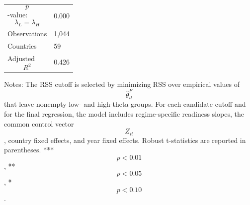 \begin{table}[H]
\begin{threeparttable}
\begin{tabularx}{\textwidth}{lY}
$$p$$-value: $$\lambda_L=\lambda_H$$ & 0.000 \\
Observations & 1,044 \\
Countries & 59 \\
Adjusted $$R^2$$ & 0.426 \\
\bottomrule
\end{tabularx}
\begin{tablenotes}[flushleft]\footnotesize
\item Notes: The RSS cutoff is selected by minimizing RSS over empirical values of $$\widehat{\theta}^{F}_{it}$$ that leave nonempty low- and high-theta groups. For each candidate cutoff and for the final regression, the model includes regime-specific readiness slopes, the common control vector $$Z_{it}$$, country fixed effects, and year fixed effects. Robust t-statistics are reported in parentheses. *** $$p<0.01$$, ** $$p<0.05$$, * $$p<0.10$$.
\end{tablenotes}
\end{threeparttable}
\end{table}

